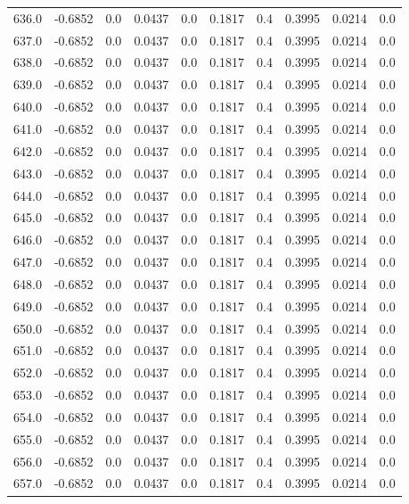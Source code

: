\begin{longtable}{lrrrrrrrrr}
636.0 & -0.6852 & 0.0 & 0.0437 & 0.0 & 0.1817 & 0.4 & 0.3995 & 0.0214 & 0.0 \\
637.0 & -0.6852 & 0.0 & 0.0437 & 0.0 & 0.1817 & 0.4 & 0.3995 & 0.0214 & 0.0 \\
638.0 & -0.6852 & 0.0 & 0.0437 & 0.0 & 0.1817 & 0.4 & 0.3995 & 0.0214 & 0.0 \\
639.0 & -0.6852 & 0.0 & 0.0437 & 0.0 & 0.1817 & 0.4 & 0.3995 & 0.0214 & 0.0 \\
640.0 & -0.6852 & 0.0 & 0.0437 & 0.0 & 0.1817 & 0.4 & 0.3995 & 0.0214 & 0.0 \\
641.0 & -0.6852 & 0.0 & 0.0437 & 0.0 & 0.1817 & 0.4 & 0.3995 & 0.0214 & 0.0 \\
642.0 & -0.6852 & 0.0 & 0.0437 & 0.0 & 0.1817 & 0.4 & 0.3995 & 0.0214 & 0.0 \\
643.0 & -0.6852 & 0.0 & 0.0437 & 0.0 & 0.1817 & 0.4 & 0.3995 & 0.0214 & 0.0 \\
644.0 & -0.6852 & 0.0 & 0.0437 & 0.0 & 0.1817 & 0.4 & 0.3995 & 0.0214 & 0.0 \\
645.0 & -0.6852 & 0.0 & 0.0437 & 0.0 & 0.1817 & 0.4 & 0.3995 & 0.0214 & 0.0 \\
646.0 & -0.6852 & 0.0 & 0.0437 & 0.0 & 0.1817 & 0.4 & 0.3995 & 0.0214 & 0.0 \\
647.0 & -0.6852 & 0.0 & 0.0437 & 0.0 & 0.1817 & 0.4 & 0.3995 & 0.0214 & 0.0 \\
648.0 & -0.6852 & 0.0 & 0.0437 & 0.0 & 0.1817 & 0.4 & 0.3995 & 0.0214 & 0.0 \\
649.0 & -0.6852 & 0.0 & 0.0437 & 0.0 & 0.1817 & 0.4 & 0.3995 & 0.0214 & 0.0 \\
650.0 & -0.6852 & 0.0 & 0.0437 & 0.0 & 0.1817 & 0.4 & 0.3995 & 0.0214 & 0.0 \\
651.0 & -0.6852 & 0.0 & 0.0437 & 0.0 & 0.1817 & 0.4 & 0.3995 & 0.0214 & 0.0 \\
652.0 & -0.6852 & 0.0 & 0.0437 & 0.0 & 0.1817 & 0.4 & 0.3995 & 0.0214 & 0.0 \\
653.0 & -0.6852 & 0.0 & 0.0437 & 0.0 & 0.1817 & 0.4 & 0.3995 & 0.0214 & 0.0 \\
654.0 & -0.6852 & 0.0 & 0.0437 & 0.0 & 0.1817 & 0.4 & 0.3995 & 0.0214 & 0.0 \\
655.0 & -0.6852 & 0.0 & 0.0437 & 0.0 & 0.1817 & 0.4 & 0.3995 & 0.0214 & 0.0 \\
656.0 & -0.6852 & 0.0 & 0.0437 & 0.0 & 0.1817 & 0.4 & 0.3995 & 0.0214 & 0.0 \\
657.0 & -0.6852 & 0.0 & 0.0437 & 0.0 & 0.1817 & 0.4 & 0.3995 & 0.0214 & 0.0 \\

\end{longtable}
